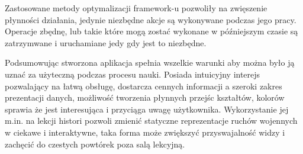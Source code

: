Zastosowane metody optymalizacji framework-u pozwoliły na zwięszenie płynności działania, jedynie niezbędne akcje są wykonywane podczas jego pracy. Operacje zbędnę, lub takie które mogą zostać wykonane w późniejszym czasie są zatrzymwane i uruchamiane jedy gdy jest to niezbędne.

Podsumowując stworzona aplikacja spełnia wszelkie warunki aby można było ją uznać za użyteczną podczas procesu nauki. Posiada intuicyjny interejs pozwalający na łatwą obsługę, dostarcza cennych informacji a szeroki zakres prezentacji danych, możliwość tworzenia płynnych przejśc kształtów, kolorów sprawia że jest interesująca i przyciąga uwagę użytkownika. Wykorzystanie jej m.in. na lekcji histori pozwoli zmienić statyczne reprezentacje ruchów wojennych w ciekawe i interaktywne, taka forma może zwiększyć przyswajalność widzy i zachęcić do czestych powtórek poza salą lekcyjną.

